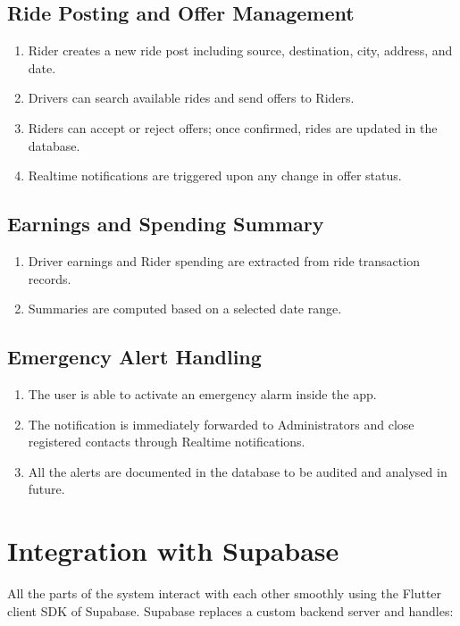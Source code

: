 \subsection{Ride Posting and Offer Management}
\begin{enumerate}
    \item Rider creates a new ride post including source, destination, city, address, and date.
    \item Drivers can search available rides and send offers to Riders.
    \item Riders can accept or reject offers; once confirmed, rides are updated in the database.
    \item Realtime notifications are triggered upon any change in offer status.
\end{enumerate}

\subsection{Earnings and Spending Summary}
\begin{enumerate}
    \item Driver earnings and Rider spending are extracted from ride transaction records.
    \item Summaries are computed based on a selected date range.
    
\end{enumerate}

\subsection{Emergency Alert Handling}
\begin{enumerate}
    \item The user is able to activate an emergency alarm inside the app.
    \item The notification is immediately forwarded to Administrators and close registered contacts through Realtime notifications.
    \item All the alerts are documented in the database to be audited and analysed in future.
\end{enumerate}

\section{Integration with Supabase}
All the parts of the system interact with each other smoothly using the Flutter client SDK of Supabase. Supabase replaces a custom backend server and handles:

